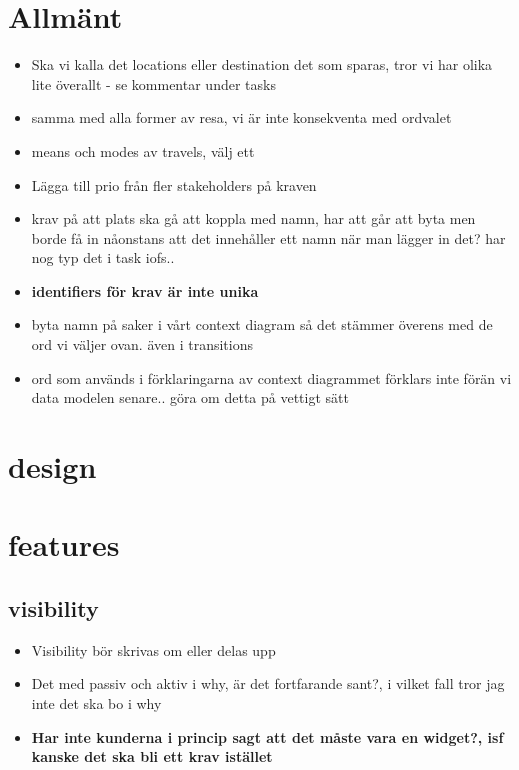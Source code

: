 \documentclass[a4paper]{article}
\begin{document}
	\thispagestyle{empty}
	\setcounter{page}{0}
	\pagebreak
	\tableofcontents
	\pagebreak

\section{Allmänt}
\begin{itemize}

	\item Ska vi kalla det locations eller destination det som sparas, tror vi har olika lite överallt - se kommentar under tasks
	\item samma med alla former av resa, vi är inte konsekventa med ordvalet
	\item means och modes av travels, välj ett

	\item Lägga till prio från fler stakeholders på kraven
	\item krav på att plats ska gå att koppla med namn, har att går att byta men borde få in nåonstans att det innehåller ett namn när man lägger in det? har nog typ det i task iofs.. 
	\item \textbf{identifiers för krav är inte unika}
	\item byta namn på saker i vårt context diagram så det stämmer överens med de ord vi väljer ovan. även i transitions
	\item ord som används i förklaringarna av context diagrammet förklars inte förän vi data modelen senare.. göra om detta på vettigt sätt
\end{itemize}

\section{design}

\section{features}
	\subsection{visibility}
		\begin{itemize}
			\item Visibility bör skrivas om eller delas upp
			\item Det med passiv och aktiv i why, är det fortfarande sant?, i vilket fall tror jag inte det ska bo i why
			\item \textbf{Har inte kunderna i princip sagt att det måste vara en widget?, isf kanske det ska bli ett krav istället}

		\end{itemize}
\end{document}
